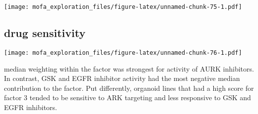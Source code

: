 \documentclass[
]{article}
\newenvironment{Shaded}{\begin{snugshade}}{\end{snugshade}}
\newcommand{\CommentTok}[1]{\textcolor[rgb]{0.56,0.35,0.01}{\textit{#1}}}
\newcommand{\DataTypeTok}[1]{\textcolor[rgb]{0.13,0.29,0.53}{#1}}
\newcommand{\DecValTok}[1]{\textcolor[rgb]{0.00,0.00,0.81}{#1}}
\newcommand{\KeywordTok}[1]{\textcolor[rgb]{0.13,0.29,0.53}{\textbf{#1}}}
\newcommand{\NormalTok}[1]{#1}
\newcommand{\OperatorTok}[1]{\textcolor[rgb]{0.81,0.36,0.00}{\textbf{#1}}}
\newcommand{\StringTok}[1]{\textcolor[rgb]{0.31,0.60,0.02}{#1}}
\begin{document}
\texttt{[image: mofa\_exploration\_files/figure-latex/unnamed-chunk-75-1.pdf]}

\hypertarget{drug-sensitivity-2}{%
\subsection{drug sensitivity}\label{drug-sensitivity-2}}

\begin{Shaded}
\end{Shaded}

\texttt{[image: mofa\_exploration\_files/figure-latex/unnamed-chunk-76-1.pdf]}

median weighting within the factor was strongest for activity of AURK
inhibitors. In contrast, GSK and EGFR inhibitor activity had the most
negative median contribution to the factor. Put differently, organoid
lines that had a high score for factor 3 tended to be sensitive to ARK
targeting and less responsive to GSK and EGFR inhibitors.
\end{document}
